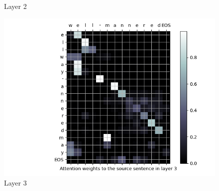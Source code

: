 \begin{enumarabic}
\begin{figure}[H]
\begin{minipage}[b]{0.33\textwidth}
        \caption{Layer 2}
        \label{fig:well-mannered-1}
      \end{minipage}
      \begin{minipage}[b]{0.33\textwidth}
        \centering
        \includegraphics[width=\textwidth]{figures/well-mannered-2.png}
        \caption{Layer 3}
        \label{fig:well-mannered-2}
      \end{minipage}
    \end{figure}


\end{enumarabic}
